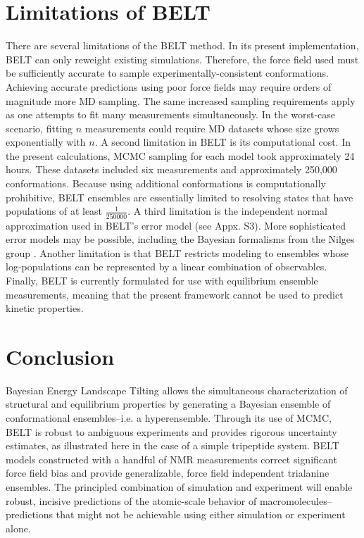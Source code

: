 \documentclass[journal=jacsat,manuscript=article]{achemso}
\begin{document}
\section*{Limitations of BELT}

There are several limitations of the BELT method.  In its present implementation, BELT can only reweight existing simulations.  Therefore, the force field used must be sufficiently accurate to sample experimentally-consistent conformations.  Achieving accurate predictions using poor force fields may require orders of magnitude more MD sampling.  The same increased sampling requirements apply as one attempts to fit many measurements simultaneously.  In the worst-case scenario, fitting $n$ measurements could require MD datasets whose size grows exponentially with $n$.  A second limitation in BELT is its computational cost.  In the present calculations, MCMC sampling for each model took approximately 24 hours.  These datasets included six measurements and approximately 250,000 conformations.  Because using additional conformations is computationally prohibitive, BELT ensembles are essentially limited to resolving states that have populations of at least $\frac{1}{250000}$.  A third limitation is the independent normal approximation 
used in BELT's error model (see Appx. S3).  More sophisticated error models may be possible, including the Bayesian formalisms from the Nilges group \cite{rieping2005, habeck2006, habeck2005bayesian}.  Another limitation is that BELT restricts modeling to ensembles whose log-populations can be represented by a linear combination of observables.  Finally, BELT is currently formulated for use with equilibrium ensemble measurements, meaning that the present framework cannot be used to predict kinetic properties.  

\section*{Conclusion}

Bayesian Energy Landscape Tilting allows the simultaneous characterization of structural and equilibrium properties by generating a Bayesian ensemble of conformational ensembles--i.e. a hyperensemble.  Through its use of MCMC, BELT is robust to ambiguous experiments and provides rigorous uncertainty estimates, as illustrated here in the case of a simple tripeptide system.  BELT models constructed with a handful of NMR measurements correct significant force field bias and provide generalizable, force field independent trialanine ensembles.  The principled combination of simulation and experiment will enable robust, incisive predictions of the atomic-scale behavior of macromolecules--predictions that might not be achievable using either simulation or experiment alone.  
\end{document}
